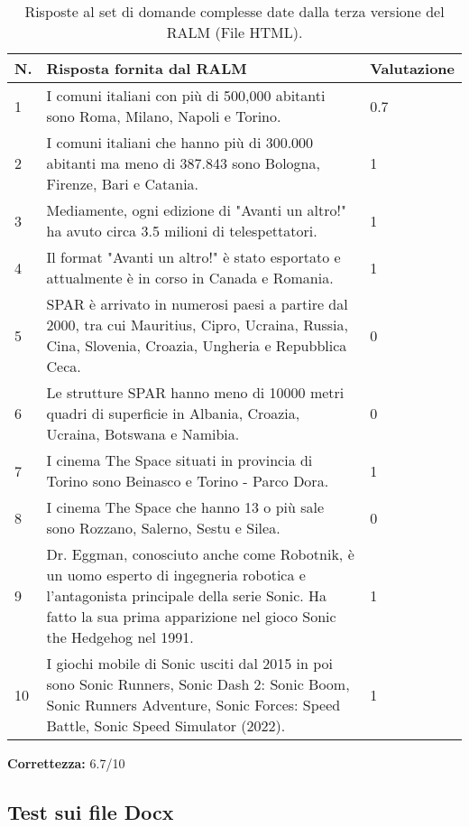 \begin{table}[H]
    \centering
    \begin{tabular}{|p{0.5cm} |p{6cm} |p{2cm}|}
        \hline
        \textbf{N}. & \textbf{Risposta fornita dal RALM} & \textbf{Valutazione} \\
        \hline
        1 & I comuni italiani con più di 500,000 abitanti sono Roma, Milano, Napoli e Torino. & 0.7 \\
        \hline
        2 & I comuni italiani che hanno più di 300.000 abitanti ma meno di 387.843 sono Bologna, Firenze, Bari e Catania. & 1 \\
        \hline
        3 & Mediamente, ogni edizione di "Avanti un altro!" ha avuto circa 3.5 milioni di telespettatori. & 1 \\
        \hline
        4 & Il format "Avanti un altro!" è stato esportato e attualmente è in corso in Canada e Romania. & 1 \\
        \hline
        5 & SPAR è arrivato in numerosi paesi a partire dal 2000, tra cui Mauritius, Cipro, Ucraina, Russia, Cina, Slovenia, Croazia, Ungheria e Repubblica Ceca. & 0 \\
        \hline
        6 & Le strutture SPAR hanno meno di 10000 metri quadri di superficie in Albania, Croazia, Ucraina, Botswana e Namibia. & 0 \\
        \hline
        7 & I cinema The Space situati in provincia di Torino sono Beinasco e Torino - Parco Dora. & 1 \\
        \hline
        8 & I cinema The Space che hanno 13 o più sale sono Rozzano, Salerno, Sestu e Silea. & 0 \\
        \hline
        9 & Dr. Eggman, conosciuto anche come Robotnik, è un uomo esperto di ingegneria robotica e l'antagonista principale della serie Sonic. Ha fatto la sua prima apparizione nel gioco Sonic the Hedgehog nel 1991.  & 1 \\
        \hline
        10 & I giochi mobile di Sonic usciti dal 2015 in poi sono Sonic Runners, Sonic Dash 2: Sonic Boom, Sonic Runners Adventure, Sonic Forces: Speed Battle, Sonic Speed Simulator (2022). & 1 \\
        \hline
    \end{tabular}
    \caption{Risposte al set di domande complesse date dalla terza versione del RALM (File HTML).}
\end{table}

\textbf{Correttezza:} 6.7/10

\subsection{Test sui file Docx}

